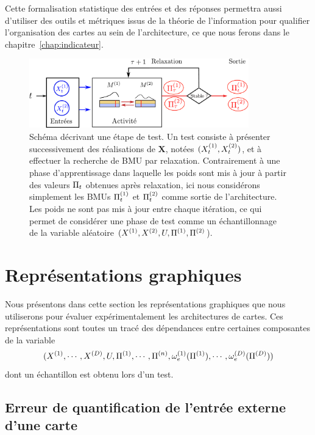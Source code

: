 \documentclass[../main]{subfiles}
\begin{document}
Cette formalisation statistique des entrées et des réponses permettra aussi d'utiliser des outils et métriques issus de la théorie de l'information pour qualifier l'organisation des cartes au sein de l'architecture, ce que nous ferons dans le chapitre~\ref{chap:indicateur}.

\begin{figure}
\centering
\includegraphics[width=0.85\textwidth]{tests_2maps.pdf}
\caption{Schéma décrivant une étape de test. Un test consiste à présenter successivement des réalisations de $\mathbf{X}$, notées $(X^{({1})}_t,X^{({2})}_t)$, et à effectuer la recherche de BMU par relaxation.
Contrairement à une phase d'apprentissage dans laquelle les poids sont mis à jour à partir des valeurs $\Pi_t$ obtenues après relaxation, ici nous considérons simplement les BMUs $\Pi_t^{({1})}$ et  $\Pi_t^{({2})}$ comme sortie de l'architecture.
Les poids ne sont pas mis à jour entre chaque itération, ce qui permet de considérer une phase de test comme un échantillonnage de la variable aléatoire $(X^{({1})},X^{({2})}, U, \Pi^{({1})}, \Pi^{({2})}$).\label{fig:flowchart} }

\end{figure}

\section{Représentations graphiques}

Nous présentons dans cette section les représentations graphiques que nous utiliserons pour évaluer expérimentalement les architectures de cartes.
Ces représentations sont toutes un tracé des dépendances entre certaines composantes de la variable $$(X^{({1})}, \cdots, X^{({D})}, U, \Pi^{({1})}, \cdots, \Pi^{({n})}, \omega_e^{({1})}(\Pi^{({1})}), \cdots, \omega_e^{({D})}(\Pi^{({D})}))$$ dont un échantillon est obtenu lors d'un test.

\subsection{Erreur de quantification de l'entrée externe d'une carte}
\end{document}
